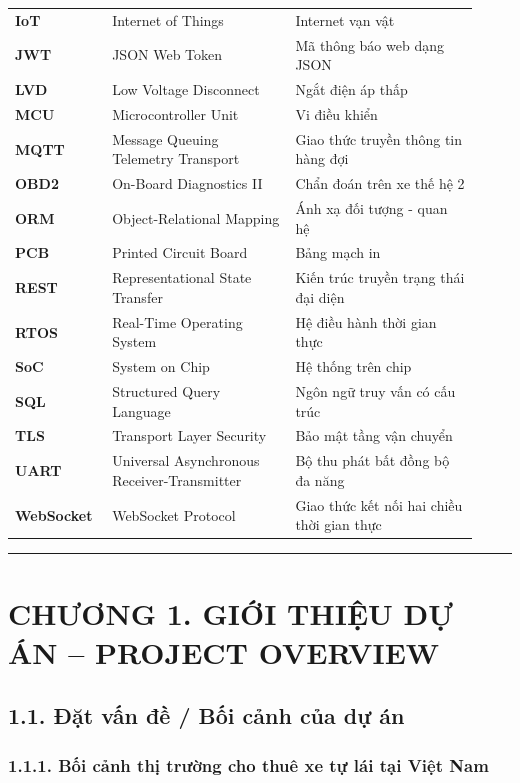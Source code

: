 \documentclass[13pt,a4paper]{extarticle}
\newcommand{\thesislongtableorignewline}{}
\let\thesislongtableorignewline\\
\renewcommand{\\}{\thesislongtableorignewline\hline}%
\let\\\thesislongtableorignewline
\newcommand{\chapterheading}[1]{\clearpage\section*{#1}\setcounter{subsection}{0}}
\newcommand{\mainmatterstart}{\clearpage\pagenumbering{arabic}\setcounter{page}{1}}
\begin{document}
{\begin{longtable}{|C{0.18\linewidth}|L{0.37\linewidth}|L{0.37\linewidth}|}
\textbf{IoT} & Internet of Things & Internet vạn vật \\
\textbf{JWT} & JSON Web Token & Mã thông báo web dạng JSON \\
\textbf{LVD} & Low Voltage Disconnect & Ngắt điện áp thấp \\
\textbf{MCU} & Microcontroller Unit & Vi điều khiển \\
\textbf{MQTT} & Message Queuing Telemetry Transport & Giao thức truyền
thông tin hàng đợi \\
\textbf{OBD2} & On-Board Diagnostics II & Chẩn đoán trên xe thế hệ 2 \\
\textbf{ORM} & Object-Relational Mapping & Ánh xạ đối tượng - quan hệ \\
\textbf{PCB} & Printed Circuit Board & Bảng mạch in \\
\textbf{REST} & Representational State Transfer & Kiến trúc truyền trạng
thái đại diện \\
\textbf{RTOS} & Real-Time Operating System & Hệ điều hành thời gian
thực \\
\textbf{SoC} & System on Chip & Hệ thống trên chip \\
\textbf{SQL} & Structured Query Language & Ngôn ngữ truy vấn có cấu
trúc \\
\textbf{TLS} & Transport Layer Security & Bảo mật tầng vận chuyển \\
\textbf{UART} & Universal Asynchronous Receiver-Transmitter & Bộ thu
phát bất đồng bộ đa năng \\
\textbf{WebSocket} & WebSocket Protocol & Giao thức kết nối hai chiều
thời gian thực \\
\end{longtable}
}

\begin{center}\rule{0.5\linewidth}{0.5pt}\end{center}

\mainmatterstart
\chapterheading{CHƯƠNG 1. GIỚI THIỆU DỰ ÁN -- PROJECT OVERVIEW}

\subsection{1.1. Đặt vấn đề / Bối cảnh của dự
án}\label{11-ux111ux1eb7t-vux1ea5n-ux111ux1ec1--bux1ed1i-cux1ea3nh-cux1ee7a-dux1ef1-uxe1n}

\subsubsection{1.1.1. Bối cảnh thị trường cho thuê xe tự lái tại Việt
Nam}\label{111-bux1ed1i-cux1ea3nh-thux1ecb-trux1b0ux1eddng-cho-thuuxea-xe-tux1ef1-luxe1i-tux1ea1i-viux1ec7t-nam}
\end{document}
